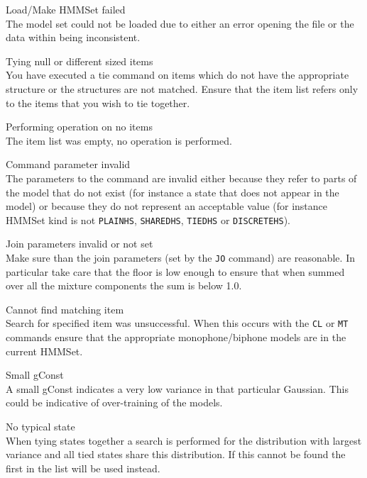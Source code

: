 \begin{itemize}
\begin{itemize}

    Load/Make HMMSet failed\\
        The model set could not be loaded due to either an error opening the
        file or the data within being inconsistent.

 Tying null or different sized items\\
        You have executed a tie command on items which do not have the 
        appropriate structure or the structures are not matched.  Ensure 
        that the item list refers only to the items that you wish to tie 
        together.

    Performing operation on no items\\
        The item list was empty, no operation is performed.

    Command parameter invalid\\
        The parameters to the command are invalid either because they
        refer to parts of the model that do not exist (for instance a
        state that does not appear in the model) or because they 
        do not represent an acceptable value (for instance HMMSet kind
        is not \texttt{PLAINHS}, \texttt{SHAREDHS}, \texttt{TIEDHS} or 
        \texttt{DISCRETEHS}).

    Join parameters invalid or not set\\
        Make sure than the join parameters (set by the \texttt{JO} command)
        are reasonable.  In particular take care that the floor is low enough 
        to ensure that when summed over all the mixture
        components the sum is below 1.0.

    Cannot find matching item\\
        Search for specified item was unsuccessful.  When this occurs with
        the \texttt{CL} or \texttt{MT} commands ensure that the appropriate 
        monophone/biphone models are in the current HMMSet.

    Small gConst\\
        A small gConst indicates a very low variance in that particular
        Gaussian.  This could be indicative of over-training of the models.

    No typical state\\
        When tying states together a search is performed for the distribution
        with largest variance and all tied states share this distribution.  If 
        this cannot be found the first in the list will be used instead.


\end{itemize}
\end{itemize}
